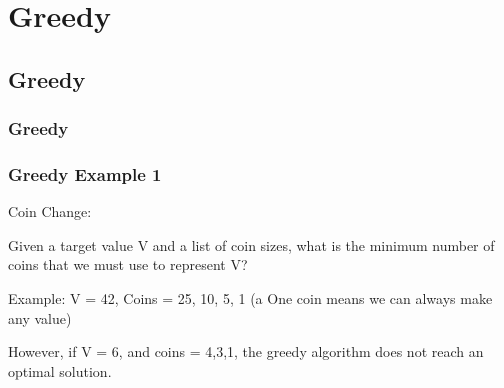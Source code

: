 \documentclass{beamer}
\begin{document}


\section{Greedy}
\subsection{Greedy}
\begin{frame}
  \frametitle{Greedy}



\end{frame}

\begin{frame}
  \frametitle{Greedy Example 1}
  Coin Change:

  Given a target value V and a list of coin sizes, what is the minimum number 
  of coins that we must use to represent V?

  Example: V = 42, Coins = 25, 10, 5, 1 (a One coin means we can always make any value)

  However, if V = 6, and coins = 4,3,1, the greedy algorithm does not
  reach an optimal solution.
\end{frame}
\end{document}
